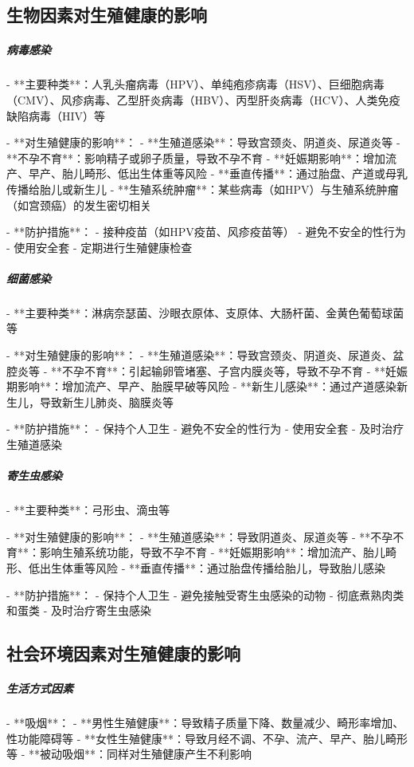 \begin{enumerate}
\subsection{生物因素对生殖健康的影响}

\subparagraph{病毒感染}

- **主要种类**：人乳头瘤病毒（HPV）、单纯疱疹病毒（HSV）、巨细胞病毒（CMV）、风疹病毒、乙型肝炎病毒（HBV）、丙型肝炎病毒（HCV）、人类免疫缺陷病毒（HIV）等

- **对生殖健康的影响**：
  - **生殖道感染**：导致宫颈炎、阴道炎、尿道炎等
  - **不孕不育**：影响精子或卵子质量，导致不孕不育
  - **妊娠期影响**：增加流产、早产、胎儿畸形、低出生体重等风险
  - **垂直传播**：通过胎盘、产道或母乳传播给胎儿或新生儿
  - **生殖系统肿瘤**：某些病毒（如HPV）与生殖系统肿瘤（如宫颈癌）的发生密切相关

- **防护措施**：
  - 接种疫苗（如HPV疫苗、风疹疫苗等）
  - 避免不安全的性行为
  - 使用安全套
  - 定期进行生殖健康检查

\subparagraph{细菌感染}

- **主要种类**：淋病奈瑟菌、沙眼衣原体、支原体、大肠杆菌、金黄色葡萄球菌等

- **对生殖健康的影响**：
  - **生殖道感染**：导致宫颈炎、阴道炎、尿道炎、盆腔炎等
  - **不孕不育**：引起输卵管堵塞、子宫内膜炎等，导致不孕不育
  - **妊娠期影响**：增加流产、早产、胎膜早破等风险
  - **新生儿感染**：通过产道感染新生儿，导致新生儿肺炎、脑膜炎等

- **防护措施**：
  - 保持个人卫生
  - 避免不安全的性行为
  - 使用安全套
  - 及时治疗生殖道感染

\subparagraph{寄生虫感染}

- **主要种类**：弓形虫、滴虫等

- **对生殖健康的影响**：
  - **生殖道感染**：导致阴道炎、尿道炎等
  - **不孕不育**：影响生殖系统功能，导致不孕不育
  - **妊娠期影响**：增加流产、胎儿畸形、低出生体重等风险
  - **垂直传播**：通过胎盘传播给胎儿，导致胎儿感染

- **防护措施**：
  - 保持个人卫生
  - 避免接触受寄生虫感染的动物
  - 彻底煮熟肉类和蛋类
  - 及时治疗寄生虫感染

\subsection{社会环境因素对生殖健康的影响}

\subparagraph{生活方式因素}

- **吸烟**：
  - **男性生殖健康**：导致精子质量下降、数量减少、畸形率增加、性功能障碍等
  - **女性生殖健康**：导致月经不调、不孕、流产、早产、胎儿畸形等
  - **被动吸烟**：同样对生殖健康产生不利影响


\end{enumerate}
